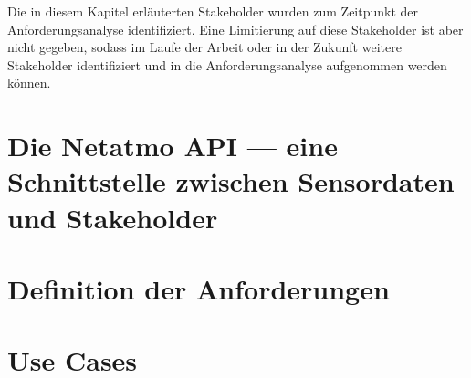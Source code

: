 Die in diesem Kapitel erläuterten Stakeholder wurden zum Zeitpunkt der Anforderungsanalyse identifiziert. Eine Limitierung auf diese Stakeholder ist aber nicht gegeben, sodass im Laufe der Arbeit oder in der Zukunft weitere Stakeholder identifiziert und in die Anforderungsanalyse aufgenommen werden können.

\section{Die Netatmo API --- eine Schnittstelle zwischen Sensordaten und Stakeholder}

\section{Definition der Anforderungen}

\section{Use Cases}